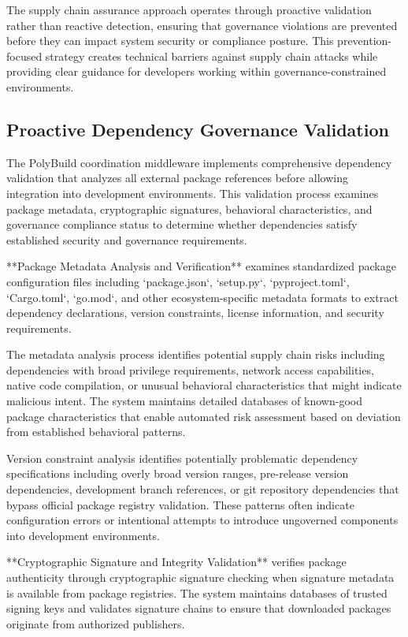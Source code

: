 The supply chain assurance approach operates through proactive validation rather than reactive detection, ensuring that governance violations are prevented before they can impact system security or compliance posture. This prevention-focused strategy creates technical barriers against supply chain attacks while providing clear guidance for developers working within governance-constrained environments.

\subsection{Proactive Dependency Governance Validation}

The PolyBuild coordination middleware implements comprehensive dependency validation that analyzes all external package references before allowing integration into development environments. This validation process examines package metadata, cryptographic signatures, behavioral characteristics, and governance compliance status to determine whether dependencies satisfy established security and governance requirements.

**Package Metadata Analysis and Verification** examines standardized package configuration files including `package.json`, `setup.py`, `pyproject.toml`, `Cargo.toml`, `go.mod`, and other ecosystem-specific metadata formats to extract dependency declarations, version constraints, license information, and security requirements.

The metadata analysis process identifies potential supply chain risks including dependencies with broad privilege requirements, network access capabilities, native code compilation, or unusual behavioral characteristics that might indicate malicious intent. The system maintains detailed databases of known-good package characteristics that enable automated risk assessment based on deviation from established behavioral patterns.

Version constraint analysis identifies potentially problematic dependency specifications including overly broad version ranges, pre-release version dependencies, development branch references, or git repository dependencies that bypass official package registry validation. These patterns often indicate configuration errors or intentional attempts to introduce ungoverned components into development environments.

**Cryptographic Signature and Integrity Validation** verifies package authenticity through cryptographic signature checking when signature metadata is available from package registries. The system maintains databases of trusted signing keys and validates signature chains to ensure that downloaded packages originate from authorized publishers.

